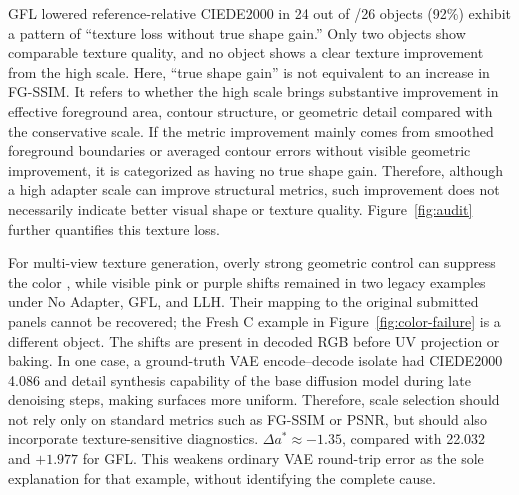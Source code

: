 \documentclass[times,twocolumn,final]{elsarticle}
\providecommand{\DIFadd}[1]{{\protect\color{blue} \sf #1}} %
\providecommand{\DIFdel}[1]{{\protect\color{red} \scriptsize #1}} %
\providecommand{\DIFaddbegin}{} %
\providecommand{\DIFaddend}{} %
\providecommand{\DIFdelbegin}{} %
\providecommand{\DIFdelend}{} %
\begin{document}
\DIFadd{GFL lowered reference-relative CIEDE2000 in }\DIFaddend 24\DIFdelbegin \DIFdel{out of }\DIFdelend \DIFaddbegin \DIFadd{/}\DIFaddend 26 objects\DIFdelbegin \DIFdel{(92\%) exhibit a pattern of ``texture loss without true shape gain.'' Only two objects show comparable texture quality, and no object shows a clear texture improvement from the high scale. Here, ``true shape gain'' is not equivalent to an increase in FG-SSIM. It refers to whether the high scale brings substantive improvement in effective foreground area, contour structure, or geometric detail compared with the conservative scale. If the metric improvement mainly comes from smoothed foreground boundaries or averaged contour errors without visible geometric improvement, it is categorized as having no true shape gain.
Therefore, although a high adapter scale can improve structural metrics, such improvement does not necessarily indicate better visual shape or texture quality. Figure~\ref{fig:audit} further quantifies this texture loss.
}%


\DIFdel{For multi-view texture generation, overly strong geometric control can suppress the color }\DIFdelend \DIFaddbegin \DIFadd{, while visible pink or purple shifts remained in two legacy examples under No Adapter, GFL, and LLH. Their mapping to the original submitted panels cannot be recovered; the Fresh C example in Figure~\ref{fig:color-failure} is a different object. The shifts are present in decoded RGB before UV projection or baking. In one case, a ground-truth VAE encode--decode isolate had CIEDE2000 4.086 }\DIFaddend and \DIFdelbegin \DIFdel{detail synthesis capability of the base diffusion model during late denoising steps, making surfaces more uniform. Therefore, scale selection should not rely only on standard metrics such as FG-SSIM or PSNR, but should also incorporate texture-sensitive diagnostics. }\DIFdelend \DIFaddbegin \DIFadd{$\Delta a^*\approx-1.35$, compared with 22.032 and $+1.977$ for GFL. This weakens ordinary VAE round-trip error as the sole explanation for that example, without identifying the complete cause.
}\DIFaddend 
\end{document}
